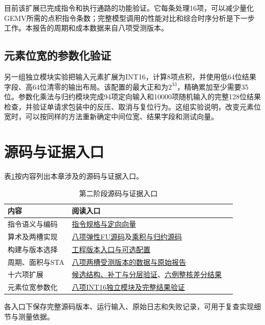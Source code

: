 目前该扩展已完成指令和执行通路的功能验证。它每条处理16项，可以减少量化GEMV所需的点积指令条数；完整模型调用的性能对比和综合时序分析是下一步工作。本报告的周期和成本数据来自八项受测版本。

\subsection{元素位宽的参数化验证}\label{sec:2-int16}
另一组独立模块实验把输入元素扩展为INT16，计算8项点积，并使用低64位结果字段、高64位清零的输出布局。该配置的最大正和为$2^{33}$，精确累加至少需要35位。参数化乘法与归约模块完成94项定向输入和10000项随机输入的完整128位结果检查，并验证单请求包装中的反压、取消与复位行为。这组实验说明，改变元素位宽时，可以按同样的方法重新确定中间位宽、结果字段和测试向量。


\section{源码与证据入口}
表\ref{tab:s2-entries}按内容列出本章涉及的源码与证据入口。
\begin{table}[!htbp]\centering
\small
\caption{第二阶段源码与证据入口}\label{tab:s2-entries}
\begin{tabular}{p{0.25\linewidth}p{0.64\linewidth}}
\toprule
内容 & 阅读入口\\
\midrule
指令语义与编码 & \href{https://github.com/cc77-builder/riscv/blob/a0f13456e0c3180fe9c4023f5cbe7874eb5d35a9/team/spec/vdot.md}{指令规格与定向向量}\\
算术及两槽实现 & \href{https://github.com/cc77-builder/riscv/blob/0f12df675378556670afd0dd2153f47fcb330610/src/main/scala/xiangshan/backend/fu/wrapper/VDotElastic.scala}{八项弹性FU源码}及\href{https://github.com/cc77-builder/riscv/blob/0f12df675378556670afd0dd2153f47fcb330610/src/main/scala/xiangshan/backend/fu/vector/VDotDatapath.scala}{乘积与归约源码}\\
构建与版本选择 & \href{https://github.com/cc77-builder/riscv/blob/f5f67e8640d8fda412e8a8946ffb8168f67d79fa/team/docs/development-route-current.md}{工程版本入口与可选配置}\\
周期、面积与STA & \href{https://github.com/cc77-builder/riscv/blob/a0f13456e0c3180fe9c4023f5cbe7874eb5d35a9/team/optimizations/o2/r3-div-gate/PERFORMANCE_COST_RESULT.md}{八项两槽受测版本的数据与原始报告}\\
十六项扩展 & \href{https://github.com/cc77-builder/riscv/blob/f5f67e8640d8fda412e8a8946ffb8168f67d79fa/team/optimizations/o2/dot16/rtl-integration/README.md}{候选结构、补丁与分层验证}、\href{https://github.com/cc77-builder/riscv/blob/f5f67e8640d8fda412e8a8946ffb8168f67d79fa/team/optimizations/o2/dot16/rtl-integration/fullcore/RESULT.md}{六例整核差分结果}\\
元素位宽参数化 & \href{https://github.com/cc77-builder/riscv/blob/a0f13456e0c3180fe9c4023f5cbe7874eb5d35a9/team/docs/t15-parameter-extension.md}{八项INT16独立模块及完整结果验证}\\
\bottomrule
\end{tabular}
\end{table}
各入口下保存完整源码版本、运行输入、原始日志和失败记录，可用于复查实现细节与测量依据。
